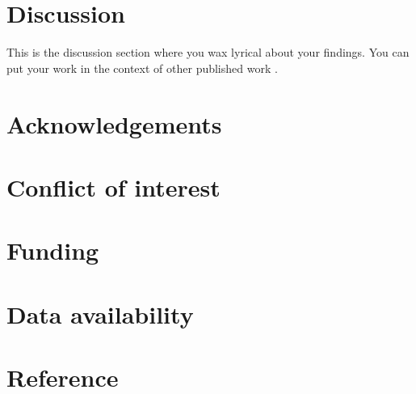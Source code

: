 \section*{Discussion}\label{s:discussion}

This is the discussion section where you wax lyrical about your findings.
You can put your work in the context of other published work \citep{brenner_uga:_1967}.



\section*{Acknowledgements}\label{s:acknowledgements}


\section*{Conflict of interest}\label{s:conflict-of-interest}

\section*{Funding}\label{s:funding}

\section*{Data availability}\label{s:data-availability}


\section*{Reference}\label{s:reference}


